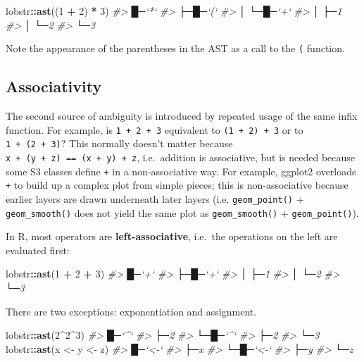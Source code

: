 \documentclass[]{book}
\newenvironment{Shaded}{\begin{snugshade}}{\end{snugshade}}
\newcommand{\CommentTok}[1]{\textcolor[rgb]{0.37,0.37,0.37}{\textit{#1}}}
\newcommand{\DecValTok}[1]{\textcolor[rgb]{0.06,0.06,0.06}{#1}}
\newcommand{\KeywordTok}[1]{\textcolor[rgb]{0.27,0.27,0.27}{\textbf{#1}}}
\newcommand{\NormalTok}[1]{#1}
\newcommand{\OperatorTok}[1]{\textcolor[rgb]{0.43,0.43,0.43}{\textbf{#1}}}
\newcommand{\StringTok}[1]{\textcolor[rgb]{0.5,0.5,0.5}{#1}}
\begin{document}
\begin{Shaded}
\begin{Highlighting}[]
\NormalTok{lobstr}\OperatorTok{::}\KeywordTok{ast}\NormalTok{((}\DecValTok{1} \OperatorTok{+}\StringTok{ }\DecValTok{2}\NormalTok{) }\OperatorTok{*}\StringTok{ }\DecValTok{3}\NormalTok{)}
\CommentTok{#> █─`*` }
\CommentTok{#> ├─█─`(` }
\CommentTok{#> │ └─█─`+` }
\CommentTok{#> │   ├─1 }
\CommentTok{#> │   └─2 }
\CommentTok{#> └─3}
\end{Highlighting}
\end{Shaded}

Note the appearance of the parentheses in the AST as a call to the \texttt{(} function.

\hypertarget{associativity}{%
\subsection{Associativity}\label{associativity}}

The second source of ambiguity is introduced by repeated usage of the same infix function. For example, is \texttt{1\ +\ 2\ +\ 3} equivalent to \texttt{(1\ +\ 2)\ +\ 3} or to \texttt{1\ +\ (2\ +\ 3)}? This normally doesn't matter because \texttt{x\ +\ (y\ +\ z)\ ==\ (x\ +\ y)\ +\ z}, i.e.~addition is associative, but is needed because some S3 classes define \texttt{+} in a non-associative way. For example, ggplot2 overloads \texttt{+} to build up a complex plot from simple pieces; this is non-associative because earlier layers are drawn underneath later layers (i.e. \texttt{geom\_point()} + \texttt{geom\_smooth()} does not yield the same plot as \texttt{geom\_smooth()} + \texttt{geom\_point()}).

In R, most operators are \textbf{left-associative}, i.e.~the operations on the left are evaluated first:

\begin{Shaded}
\begin{Highlighting}[]
\NormalTok{lobstr}\OperatorTok{::}\KeywordTok{ast}\NormalTok{(}\DecValTok{1} \OperatorTok{+}\StringTok{ }\DecValTok{2} \OperatorTok{+}\StringTok{ }\DecValTok{3}\NormalTok{)}
\CommentTok{#> █─`+` }
\CommentTok{#> ├─█─`+` }
\CommentTok{#> │ ├─1 }
\CommentTok{#> │ └─2 }
\CommentTok{#> └─3}
\end{Highlighting}
\end{Shaded}

There are two exceptions: exponentiation and assignment.

\begin{Shaded}
\begin{Highlighting}[]
\NormalTok{lobstr}\OperatorTok{::}\KeywordTok{ast}\NormalTok{(}\DecValTok{2}\OperatorTok{^}\DecValTok{2}\OperatorTok{^}\DecValTok{3}\NormalTok{)}
\CommentTok{#> █─`^` }
\CommentTok{#> ├─2 }
\CommentTok{#> └─█─`^` }
\CommentTok{#>   ├─2 }
\CommentTok{#>   └─3}
\NormalTok{lobstr}\OperatorTok{::}\KeywordTok{ast}\NormalTok{(x <-}\StringTok{ }\NormalTok{y <-}\StringTok{ }\NormalTok{z)}
\CommentTok{#> █─`<-` }
\CommentTok{#> ├─x }
\CommentTok{#> └─█─`<-` }
\CommentTok{#>   ├─y }
\CommentTok{#>   └─z}
\end{Highlighting}
\end{Shaded}
\end{document}
